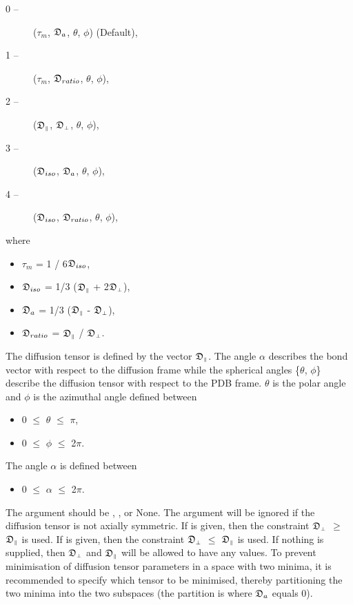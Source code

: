 \begin{description}
\item[    0 --]   ($\tau_m$, $\mathfrak{D}_a$, $\theta$, $\phi$)   (Default),
\item[    1 --]   ($\tau_m$, $\mathfrak{D}_{ratio}$, $\theta$, $\phi$),
\item[    2 --]   ($\mathfrak{D}_{\scriptscriptstyle \parallel}$, $\mathfrak{D}_{\scriptscriptstyle \perp}$, $\theta$, $\phi$),
\item[    3 --]   ($\mathfrak{D}_{iso}$, $\mathfrak{D}_a$, $\theta$, $\phi$),
\item[    4 --]   ($\mathfrak{D}_{iso}$, $\mathfrak{D}_{ratio}$, $\theta$, $\phi$),
\end{description}

where

\begin{itemize}
\item[]     $\tau_m$ = 1 / 6$\mathfrak{D}_{iso}$,
\item[]     $\mathfrak{D}_{iso}$ = 1/3 ($\mathfrak{D}_{\scriptscriptstyle \parallel}$ + 2$\mathfrak{D}_{\scriptscriptstyle \perp}$),
\item[]     $\mathfrak{D}_a$ = 1/3 ($\mathfrak{D}_{\scriptscriptstyle \parallel}$ - $\mathfrak{D}_{\scriptscriptstyle \perp}$),
\item[]     $\mathfrak{D}_{ratio}$ = $\mathfrak{D}_{\scriptscriptstyle \parallel}$ / $\mathfrak{D}_{\scriptscriptstyle \perp}$.
\end{itemize}

The diffusion tensor  is defined by the vector $\mathfrak{D}_{\scriptscriptstyle \parallel}$.  The angle  $\alpha$ describes the bond
vector with respect to the diffusion frame while the spherical angles  \{$\theta$, $\phi$\} describe
the diffusion tensor  with respect to the PDB  frame.  $\theta$ is the polar angle  and $\phi$ is the
azimuthal angle  defined between

\begin{itemize}
\item[]     0 $\le$ $\theta$ $\le$ $\pi$,
\item[]     0 $\le$ $\phi$ $\le$ 2$\pi$.
\end{itemize}

The angle  $\alpha$ is defined between

\begin{itemize}
\item[]     0 $\le$ $\alpha$ $\le$ 2$\pi$.
\end{itemize}

The 
 argument should be 
, 
, or None.  The argument will be
ignored if the diffusion tensor  is not axially symmetric.   If 
 is given, then the
constraint  $\mathfrak{D}_{\scriptscriptstyle \perp}$ $\ge$ $\mathfrak{D}_{\scriptscriptstyle \parallel}$ is used.  If 
 is given, then the constraint  $\mathfrak{D}_{\scriptscriptstyle \perp}$ $\le$ $\mathfrak{D}_{\scriptscriptstyle \parallel}$ is
used.  If nothing is supplied, then $\mathfrak{D}_{\scriptscriptstyle \perp}$ and $\mathfrak{D}_{\scriptscriptstyle \parallel}$ will be allowed to have any values.  To
prevent minimisation  of diffusion tensor  parameters in a space with two minima, it is
recommended to specify which tensor to be minimised,  thereby partitioning the two minima
into the two subspaces (the partition is where $\mathfrak{D}_a$ equals 0).


